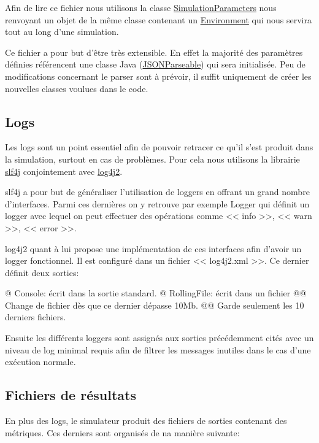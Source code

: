 \documentclass[final]{polytech/polytech}
\newcommand{\klass}[1]{\hyperref[class:#1]{#1}}
\begin{document}
			Afin de lire ce fichier nous utilisons la classe \klass{SimulationParameters} nous renvoyant un objet de la même classe contenant un \klass{Environment} qui nous servira tout au long d'une simulation.
			
			Ce fichier a pour but d'être très extensible.
			En effet la majorité des paramètres définies référencent une classe Java (\klass{JSONParseable}) qui sera initialisée.
			Peu de modifications concernant le parser sont à prévoir, il suffit uniquement de créer les nouvelles classes voulues dans le code.
			
		\subsection{Logs}
			Les logs sont un point essentiel afin de pouvoir retracer ce qu'il s'est produit dans la simulation, surtout en cas de problèmes.
			Pour cela nous utilisons la librairie \href{https://www.slf4j.org/}{slf4j} conjointement avec \href{https://logging.apache.org/log4j/2.x/}{log4j2}.
			
			slf4j a pour but de généraliser l'utilisation de loggers en offrant un grand nombre d'interfaces.
			Parmi ces dernières on y retrouve par exemple Logger qui définit un logger avec lequel on peut effectuer des opérations comme << info >>, << warn >>, << error >>.
			
			log4j2 quant à lui propose une implémentation de ces interfaces afin d'avoir un logger fonctionnel.
			Il est configuré dans un fichier << log4j2.xml >>.
			Ce dernier définit deux sorties:
			\begin{easylist}
				@ Console: écrit dans la sortie standard.
				@ RollingFile: écrit dans un fichier
				@@ Change de fichier dès que ce dernier dépasse 10Mb.
				@@ Garde seulement les 10 derniers fichiers.
			\end{easylist}
			
			Ensuite les différents loggers sont assignés aux sorties précédemment cités avec un niveau de log minimal requis afin de filtrer les messages inutiles dans le cas d'une exécution normale.
		
		\subsection{Fichiers de résultats\label{sec:dev:metrics}}
			En plus des logs, le simulateur produit des fichiers de sorties contenant des métriques.
			Ces derniers sont organisés de na manière suivante:
			
\end{document}
